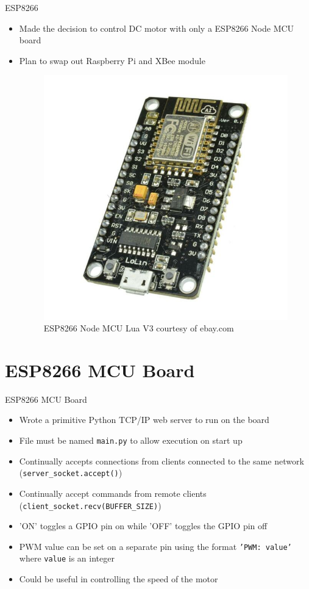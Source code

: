 \documentclass{beamer}
\begin{document}
\begin{frame}{ESP8266}{}
\begin{itemize}
\item Made the decision to control DC motor with only a ESP8266 Node MCU board
\item Plan to swap out Raspberry Pi and XBee module
\begin{figure}
\includegraphics[scale=0.89]{figs/img/esp8266NodeMCU}
\caption{ESP8266 Node MCU Lua V3 courtesy of ebay.com}
\end{figure}
\end{itemize}
\end{frame}

\section{ESP8266 MCU Board}
\begin{frame}{ESP8266 MCU Board}{}
\begin{itemize}
\item Wrote a primitive Python TCP/IP web server to run on the board
\item File must be named \texttt{main.py} to allow execution on start up
\item Continually accepts connections from clients connected to the same network (\texttt{server\_socket.accept()})
\item Continually accept commands from remote clients (\texttt{client\_socket.recv(BUFFER\_SIZE)})
\item 'ON' toggles a GPIO pin on while 'OFF' toggles the GPIO pin off
\item PWM value can be set on a separate pin using the format \texttt{'PWM: value'} where \texttt{value} is an integer
\item Could be useful in controlling the speed of the motor
\end{itemize}
\end{frame}
\end{document}
